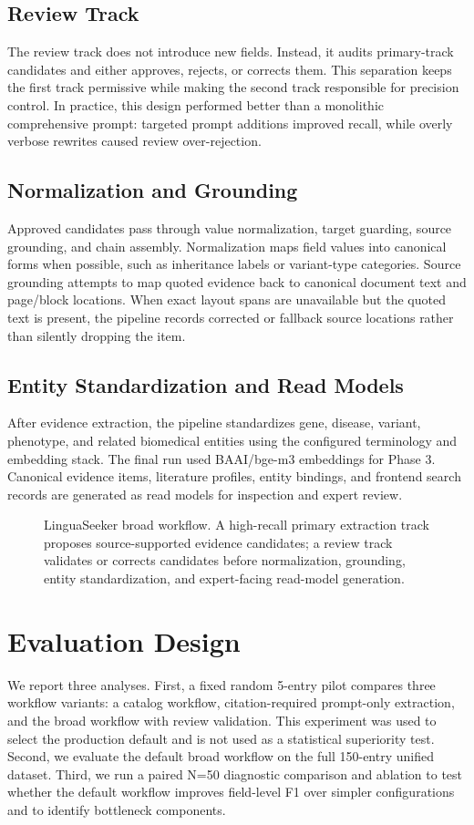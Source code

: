 \documentclass[conference]{IEEEtran}
\newcommand{\methodname}{LinguaSeeker}
\newcommand{\bmode}{broad}
\begin{document}
\subsection{Review Track}
The review track does not introduce new fields. Instead, it audits primary-track candidates and either approves, rejects, or corrects them. This separation keeps the first track permissive while making the second track responsible for precision control. In practice, this design performed better than a monolithic comprehensive prompt: targeted prompt additions improved recall, while overly verbose rewrites caused review over-rejection.

\subsection{Normalization and Grounding}
Approved candidates pass through value normalization, target guarding, source grounding, and chain assembly. Normalization maps field values into canonical forms when possible, such as inheritance labels or variant-type categories. Source grounding attempts to map quoted evidence back to canonical document text and page/block locations. When exact layout spans are unavailable but the quoted text is present, the pipeline records corrected or fallback source locations rather than silently dropping the item.

\subsection{Entity Standardization and Read Models}
After evidence extraction, the pipeline standardizes gene, disease, variant, phenotype, and related biomedical entities using the configured terminology and embedding stack. The final run used BAAI/bge-m3 embeddings for Phase 3. Canonical evidence items, literature profiles, entity bindings, and frontend search records are generated as read models for inspection and expert review.

\begin{figure}[t]
\centering

\caption{\methodname{} \bmode{} workflow. A high-recall primary extraction track proposes source-supported evidence candidates; a review track validates or corrects candidates before normalization, grounding, entity standardization, and expert-facing read-model generation.}
\label{fig:pipeline}
\end{figure}

\section{Evaluation Design}
We report three analyses. First, a fixed random 5-entry pilot compares three workflow variants: a catalog workflow, citation-required prompt-only extraction, and the broad workflow with review validation. This experiment was used to select the production default and is not used as a statistical superiority test. Second, we evaluate the default broad workflow on the full 150-entry unified dataset. Third, we run a paired N=50 diagnostic comparison and ablation to test whether the default workflow improves field-level F1 over simpler configurations and to identify bottleneck components.
\end{document}
